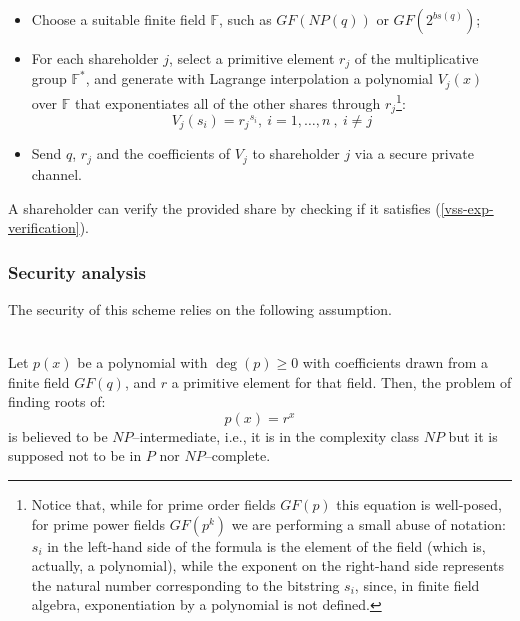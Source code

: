 \documentclass[10pt,journal,cspaper,compsoc]{IEEEtran}
\begin{document}
\begin{itemize}
\item Choose a suitable finite field $\mathbb{F}$, such as $GF(NP(q))$ or $GF(2^{bs(q)})$;
\item For each shareholder $j$, select a primitive element $r_j$ of the multiplicative group $\mathbb{F}^*$, and generate with Lagrange interpolation a polynomial $V_j(x)$ over $\mathbb{F}$ that exponentiates all of the other shares through $r_j$\footnote{Notice that, while for prime order fields $GF(p)$ this equation is well-posed, for prime power fields $GF(p^k)$ we are performing a small abuse of notation: $s_i$ in the left-hand side of the formula is the element of the field (which is, actually, a polynomial), while the exponent on the right-hand side represents the natural number corresponding to the bitstring $s_i$, since, in finite field algebra, exponentiation by a polynomial is not defined.}:
\begin{equation}
\label{vss-exp-verification}
V_j(s_i) = {r_j}^{s_i},~i=1,\ldots,n~,~i \neq j
\end{equation}
\item Send $q$, $r_j$ and the coefficients of $V_j$ to shareholder $j$ via a secure private channel.
\end{itemize}

A shareholder can verify the provided share by checking if it satisfies (\ref{vss-exp-verification}).

\subsubsection{Security analysis}
The security of this scheme relies on the following assumption.

\begin{defn}~\\
Let $p(x)$ be a polynomial with ${\deg(p) \geq 0}$ with coefficients drawn from a finite field $GF(q)$, and $r$ a primitive element for that field. Then, the problem of finding roots of:
\begin{equation}
\label{eprp-equation}
p(x) = r^x
\end{equation}
is believed to be $NP$--intermediate, i.e., it is in the complexity class $NP$ but it is supposed not to be in $P$ nor $NP$--complete.
\end{defn}
\end{document}
